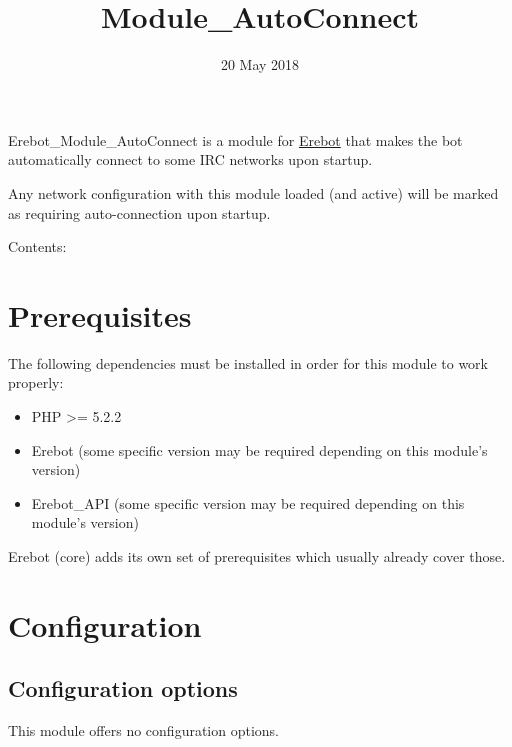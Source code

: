 \documentclass[letterpaper,10pt,french]{sphinxmanual}
\title{Module_AutoConnect}
\date{20 May 2018}
\author{}
\begin{document}
\maketitle
\tableofcontents
{}\label{index::doc}\begin{quote}
\end{quote}



Erebot\_Module\_AutoConnect is a module for \href{https://www.erebot.net/}{Erebot} that makes the bot
automatically connect to some IRC networks upon startup.

Any network configuration with this module loaded (and active) will
be marked as requiring auto-connection upon startup.

Contents:
\begin{quote}
\end{quote}


\chapter{Prerequisites}
\label{Prerequisites:prerequisites}\label{Prerequisites:welcome-to-the-documentation-for-erebot-module-autoconnect}\label{Prerequisites::doc}
The following dependencies must be installed in order for this module
to work properly:
\begin{itemize}
\item {} 
PHP \textgreater{}= 5.2.2

\item {} 
Erebot (some specific version may be required depending
on this module's version)

\item {} 
Erebot\_API (some specific version may be required depending
on this module's version)

\end{itemize}

Erebot (core) adds its own set of prerequisites which usually already
cover those.
\begin{quote}
\end{quote}


\chapter{Configuration}
\label{Configuration:configuration}\label{Configuration::doc}\label{Configuration:id1}

\section{Configuration options}
\label{Configuration:configuration-options}
This module offers no configuration options.
\end{document}

